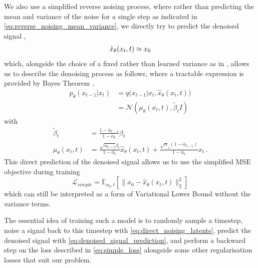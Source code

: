 We also use a simplified reverse noising process, where rather than predicting the mean and variance of the noise for a single step as indicated in \eqref{eq:reverse_noising_mean_variance}, we directly try to predict the denoised signal \cite{ramesh2022hierarchical},
\begin{equation}
    \label{eq:denoised_signal_prediction}
    \hat{x}_{\theta}(x_t, t) \approx x_0 \\
\end{equation}
which, alongside the choice of a fixed rather than learned variance as in \cite{ddpm}, allows us to describe the denoising process as follows, where a tractable expression is provided by Bayes Theorem \cite{improved_diffusion},
\begin{equation}
    \label{eq:direct_prediction_denoising}
    \begin{aligned}
    p_{\theta}(x_{t-1} | x_t) &= q\big(x_{t-1} | x_t, \hat{x}_{\theta}(x_t, t)\big)  \\
    &= \mathcal{N}(\mu_{\theta}(x_t, t), \tilde{\beta}_t I)
    \end{aligned}
\end{equation}
with 
\begin{equation}
    \label{eq:direct_prediction_denoising_details}
    \begin{aligned}
    \tilde{\beta}_t &= \frac{1 - \bar{\alpha}_{t-1}}{1 - \bar{\alpha}_t} \beta_t \\
    \mu_{\theta}(x_t, t) &= \frac{\sqrt{\bar{\alpha}_{t-1}}\beta_t}{1-\bar{\alpha}_t}\hat{x}_{\theta}(x_t, t) + \frac{\sqrt{\alpha}_t(1-\bar{\alpha}_{t-1})}{1-\bar{\alpha}_t}x_t\,.
    \end{aligned}
\end{equation}
This direct prediction of the denoised signal allows us to use the simplified MSE objective \cite{ddpm,ramesh2022hierarchical} during training
\begin{equation}
    \label{eq:simple_loss}
    \mathcal{L}_{simple} = \mathbb{E}_{x_0,t}\left[ \| x_0 - \hat{x}_{\theta}(x_t, t) \|_2^2 \right]
\end{equation}
which can still be interpreted as a form of Variational Lower Bound without the variance terms.

The essential idea of training such a model is to randomly sample a timestep, noise a signal back to this timestep with \eqref{eq:direct_noising_latents}, predict the denoised signal with \eqref{eq:denoised_signal_prediction}, and perform a backward step on the loss described in \eqref{eq:simple_loss} alongside some other regularisation losses that suit our problem.

